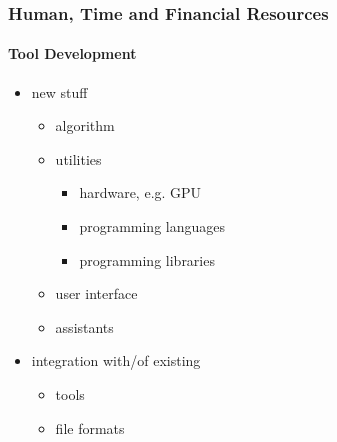 \documentclass[10pt, aspectratio=169]{beamer}
\begin{document}
\begin{frame}
\frametitle{Human, Time and Financial Resources}
\framesubtitle{Tool Development}

\begin{itemize}
  \item new stuff
  \begin{itemize}
    \item algorithm
    \item utilities
    \begin{itemize}
      \item hardware, e.g. GPU
      \item programming languages
      \item programming libraries
    \end{itemize} 
    \item user interface
    \item assistants
  \end{itemize}

  \item integration with/of existing
  \begin{itemize}
    \item tools
    \item file formats
  \end{itemize}
\end{itemize}
\end{frame}
\end{document}
